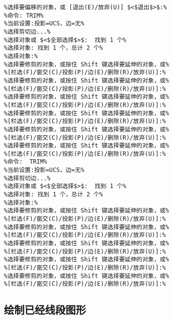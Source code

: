 \begin{lstlisting}
%选择要偏移的对象，或 [退出(E)/放弃(U)] $<$退出$>$:%
%命令: TRIM%
%当前设置:投影=UCS，边=无%
%选择剪切边...%
%选择对象或 $<$全部选择$>$:  找到 1 个%
%选择对象: 找到 1 个，总计 2 个%
%选择对象:%
%选择要修剪的对象，或按住 Shift 键选择要延伸的对象，或%
%[栏选(F)/窗交(C)/投影(P)/边(E)/删除(R)/放弃(U)]:%
%选择要修剪的对象，或按住 Shift 键选择要延伸的对象，或%
%[栏选(F)/窗交(C)/投影(P)/边(E)/删除(R)/放弃(U)]:%
%选择要修剪的对象，或按住 Shift 键选择要延伸的对象，或%
%[栏选(F)/窗交(C)/投影(P)/边(E)/删除(R)/放弃(U)]:%
%选择要修剪的对象，或按住 Shift 键选择要延伸的对象，或%
%[栏选(F)/窗交(C)/投影(P)/边(E)/删除(R)/放弃(U)]:%
%选择要修剪的对象，或按住 Shift 键选择要延伸的对象，或%
%[栏选(F)/窗交(C)/投影(P)/边(E)/删除(R)/放弃(U)]:%
%选择要修剪的对象，或按住 Shift 键选择要延伸的对象，或%
%[栏选(F)/窗交(C)/投影(P)/边(E)/删除(R)/放弃(U)]:%
%命令:  TRIM%
%当前设置:投影=UCS，边=无%
%选择剪切边...%
%选择对象或 $<$全部选择$>$:  找到 1 个%
%选择对象: 找到 1 个，总计 2 个%
%选择对象:%
%选择要修剪的对象，或按住 Shift 键选择要延伸的对象，或%
%[栏选(F)/窗交(C)/投影(P)/边(E)/删除(R)/放弃(U)]:%
%选择要修剪的对象，或按住 Shift 键选择要延伸的对象，或%
%[栏选(F)/窗交(C)/投影(P)/边(E)/删除(R)/放弃(U)]:%
%选择要修剪的对象，或按住 Shift 键选择要延伸的对象，或%
%[栏选(F)/窗交(C)/投影(P)/边(E)/删除(R)/放弃(U)]:%
%选择要修剪的对象，或按住 Shift 键选择要延伸的对象，或%
%[栏选(F)/窗交(C)/投影(P)/边(E)/删除(R)/放弃(U)]:%
%选择要修剪的对象，或按住 Shift 键选择要延伸的对象，或%
%[栏选(F)/窗交(C)/投影(P)/边(E)/删除(R)/放弃(U)]:%
\end{lstlisting}
\subsection{绘制已经线段图形}

